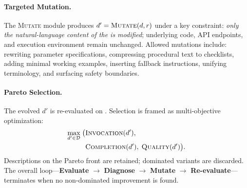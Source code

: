 \paragraph{Targeted Mutation.}
The \textsc{Mutate} module produces $d' = \textsc{Mutate}(d, r)$ under a key constraint: \emph{only the natural-language content of the \skillmd is modified}; underlying code, API endpoints, and execution environment remain unchanged.
Allowed mutations include: rewriting parameter specifications, compressing procedural text to checklists, adding minimal working examples, inserting fallback instructions, unifying terminology, and surfacing safety boundaries.

\paragraph{Pareto Selection.}
The evolved $d'$ is re-evaluated on \medskillbench.
Selection is framed as multi-objective optimization:
\begin{equation}
    \begin{split}
    \max_{d' \in \mathcal{D}} \;\bigl(&\textsc{Invocation}(d'),\\
    &\textsc{Completion}(d'),\; \textsc{Quality}(d')\bigr).
    \end{split}
    \label{eq:pareto}
\end{equation}
Descriptions on the Pareto front are retained; dominated variants are discarded.
The overall loop---\textbf{Evaluate} $\to$ \textbf{Diagnose} $\to$ \textbf{Mutate} $\to$ \textbf{Re-evaluate}---terminates when no non-dominated improvement is found.

